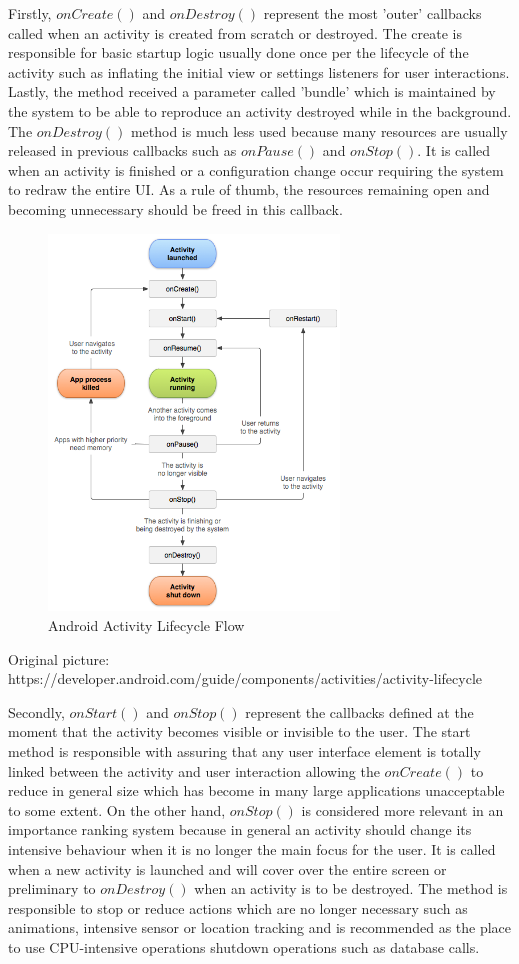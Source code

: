 Firstly, $onCreate()$ and $onDestroy()$ represent the most 'outer' callbacks called when an activity is created from scratch or destroyed. The create is responsible for basic startup logic usually done once per the lifecycle of the activity such as inflating the initial view or settings listeners for user interactions. Lastly, the method received a parameter called 'bundle' which is maintained by the system to be able to reproduce an activity destroyed while in the background. The $onDestroy()$ method is much less used because many resources are usually released in previous callbacks such as $onPause()$ and $onStop()$. It is called when an activity is finished or a configuration change occur requiring the system to redraw the entire UI. As a rule of thumb, the resources remaining open and becoming unnecessary should be freed in this callback.

\begin{figure}[H]
\centering
\includegraphics[height=10cm]{images/ActivityLifecycle.png} 
\caption{Android Activity Lifecycle Flow}
\label{fig:androidactivitylifecycle}
\end{figure}
\begin{flushright}
Original picture: https://developer.android.com/guide/components/activities/activity-lifecycle
\end{flushright}

Secondly, $onStart()$ and $onStop()$ represent the callbacks defined at the moment that the activity becomes visible or invisible to the user. The start method is responsible with assuring that any user interface element is totally linked between the activity and user interaction allowing the $onCreate()$ to reduce in general size which has become in many large applications unacceptable to some extent. On the other hand, $onStop()$ is considered more relevant in an importance ranking system because in general an activity should change its intensive behaviour when it is no longer the main focus for the user. It is called when a new activity is launched and will cover over the entire screen or preliminary to $onDestroy()$ when an activity is to be destroyed. The method is responsible to stop or reduce actions which are no longer necessary such as animations, intensive sensor or location tracking and is recommended as the place to use CPU-intensive operations shutdown operations such as database calls.


